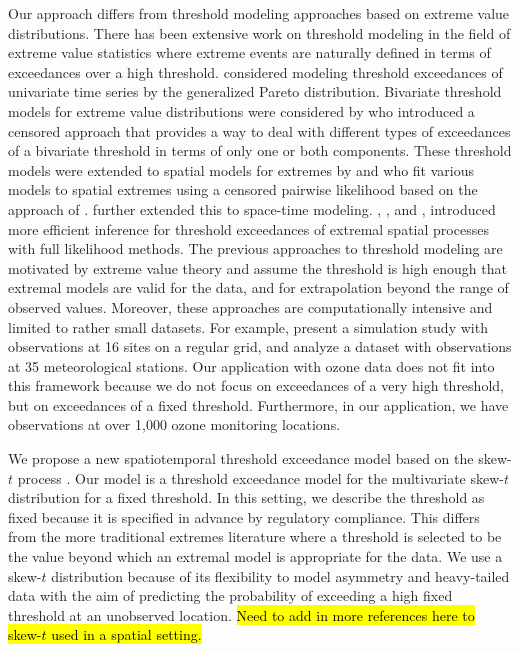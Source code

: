 \documentclass[useAMS,usenatbib,referee]{biom}
\providecommand{\DIFaddbegin}{} %
\providecommand{\DIFaddend}{} %
\begin{document}
Our approach differs from threshold modeling approaches based on extreme value distributions.
There has been extensive work on threshold modeling in the field of extreme value statistics where extreme events are naturally defined in terms of exceedances over a high threshold.
\citet{Davison1990} considered modeling threshold exceedances of univariate time series by the generalized Pareto distribution.
Bivariate threshold models for extreme value distributions were considered by \citet{Ledford1996} who introduced a censored approach that provides a way to deal with different types of exceedances of a bivariate threshold in terms of only one or both components.
These threshold models were extended to spatial models for extremes by \citet{Wadsworth2012} and \citet{Thibaud2013} who fit various models to spatial extremes using a censored pairwise likelihood \citep{Padoan2010} based on the approach of \citet{Ledford1996}.
\citet{Huser2014} further extended this to space-time modeling.
\citet{Thibaud2013a}, \citet{Engelke2014}, and \citet{Wadsworth2014}, introduced more efficient inference for threshold exceedances of extremal spatial processes with full likelihood methods.
The previous approaches to threshold modeling are motivated by extreme value theory and assume the threshold is high enough that extremal models are valid for the data, and for extrapolation beyond the range of observed values.
Moreover, these approaches are computationally intensive and limited to rather small datasets.
For example, \citet{Wadsworth2014} present a simulation study with observations at 16 sites on a regular grid, and \citet{Engelke2014} analyze a dataset with observations at 35 meteorological stations.
Our application with ozone data does not fit into this framework because we do not focus on exceedances of a very high threshold, but on exceedances of a fixed threshold.
Furthermore, in our application, we have observations at over 1,000 ozone monitoring locations.

We propose a new spatiotemporal threshold exceedance model based on the skew-$t$ process \citep{Padoan2011}.
Our model is a threshold exceedance model for the multivariate skew-$t$ distribution for a fixed threshold.
In this setting, we describe the threshold as fixed because it is specified in advance by regulatory compliance.
This differs from the more traditional extremes literature where a threshold is selected to be the value beyond which an extremal model is appropriate for the data.
We use a skew-$t$ distribution because of its flexibility to model asymmetry and heavy-tailed data with the aim of predicting the probability of exceeding a high fixed threshold at an unobserved location.
\DIFaddbegin \hl{Need to add in more references here to skew-$t$ used in a spatial setting.}
\DIFaddend 
\end{document}
